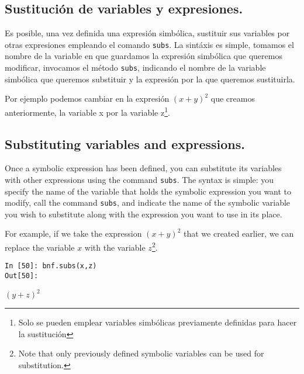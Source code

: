 \begin{paracol}{2}
\subsection{Sustitución de variables y expresiones.}
Es posible, una vez definida una expresión simbólica, sustituir sus variables por otras expresiones empleando el comando \texttt{subs}. La sintáxis es simple, tomamos el nombre de la variable en que guardamos la expresión simbólica que queremos modificar, invocamos el método \texttt{subs}, indicando el nombre de la variable simbólica que queremos substituir y la expresión por la que queremos sustituirla. 

Por ejemplo podemos cambiar en la expresión $(x+y)^2$ que creamos anteriormente, la variable x por la variable z\footnote{Solo se pueden emplear variables simbólicas previamente definidas para hacer la sustitución}. 
\switchcolumn
\subsection{Substituting variables and expressions.}
Once a symbolic expression has been defined, you can substitute its variables with other expressions using the command \texttt{subs}. The syntax is simple: you specify the name of the variable that holds the symbolic expression you want to modify, call the command \texttt{subs}, and indicate the name of the symbolic variable you wish to substitute along with the expression you want to use in its place. 

For example, if we take the expression \((x+y)^2\) that we created earlier, we can replace the variable \(x\) with the variable \(z\)\footnote{Note that only previously defined symbolic variables can be used for substitution.}.

\end{paracol}
\begin{center}
	\begin{minipage}{.25\textwidth}
		\begin{verbatim}
In [50]: bnf.subs(x,z)
Out[50]:
		\end{verbatim}
		$(y+z)^2$
	\end{minipage}
\end{center}

